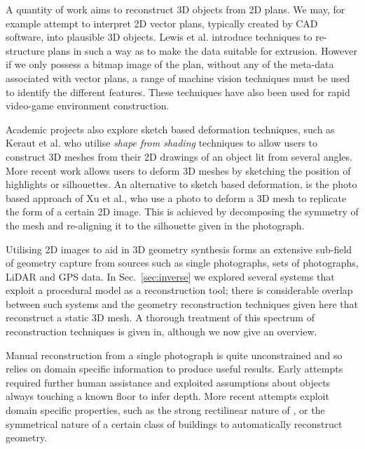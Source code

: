 



A quantity of work aims to reconstruct 3D objects from 2D plans\cite{Yin2009}. We may, for example attempt to interpret 2D vector plans, typically created by CAD software, into plausible 3D objects. Lewis et al.\cite{Lewis98} introduce techniques to re-structure plans in such a way as to make the data suitable for extrusion. However if we only possess a bitmap image of the plan, without any of the meta-data associated with vector plans, a range of machine vision techniques must be used to identify the different features\cite{Dosch00}. These techniques have also been used for rapid video-game environment construction\cite{Fong11}.


Academic projects also explore sketch based deformation techniques, such as Keraut et al.\cite{Kerautret05} who utilise \emph{shape from shading} techniques to allow users to construct 3D meshes from their 2D drawings of an object lit from several angles. More recent work allows users to deform 3D meshes by sketching the position of highlights or silhouettes\cite{Gingold08}. 
An alternative to sketch based deformation, is the photo based approach of Xu et al.\cite{Xu11photo}, who use a photo to deform a 3D mesh to replicate the form of a certain 2D image. This is achieved by decomposing the symmetry of the mesh and re-aligning it to the silhouette given in the photograph.

Utilising 2D images to aid in 3D geometry synthesis forms an extensive sub-field of geometry capture from sources such as single photographs, sets of photographs, LiDAR and GPS data. In Sec.~\ref{sec:inverse} we explored several systems that exploit a procedural model as a reconstruction tool; there is considerable overlap between such systems and the geometry reconstruction techniques given here that reconstruct a static 3D mesh. A thorough treatment of this spectrum of reconstruction techniques is given in\cite{Musialski12}, although we now give an overview.

Manual reconstruction from a single photograph is quite unconstrained and so relies on domain specific information to produce useful results. Early attempts\cite{Horry97} required further human assistance and exploited assumptions about objects always touching a known floor to infer depth. 
More recent attempts exploit domain specific properties, such as the strong rectilinear nature of \facades\cite{Mueller:2007:IBP}, or the symmetrical nature of a certain class of buildings\cite{Jiang09} to automatically reconstruct geometry.

